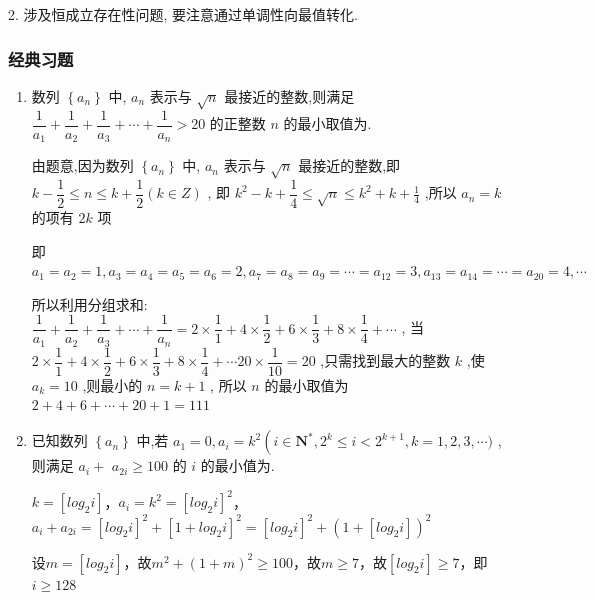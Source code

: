 2. 涉及恒成立存在性问题, 要注意通过单调性向最值转化.

\subsubsection*{经典习题}
\begin{enumerate}
    \item 数列 $\left\{  {a}_{n}\right\}$ 中, ${a}_{n}$ 表示与 $\sqrt{n}$ 最接近的整数,则满足 $\dfrac{1}{{a}_{1}} + \dfrac{1}{{a}_{2}} + \dfrac{1}{{a}_{3}} + \cdots  + \dfrac{1}{{a}_{n}} > {20}$ 的正整数 $n$ 的最小取值为.
    \begin{jieda}
        由题意,因为数列 $\left\{  {a}_{n}\right\}$ 中, ${a}_{n}$ 表示与 $\sqrt{n}$ 最接近的整数,即 $k - \dfrac{1}{2} \leq  n \leq  k + \dfrac{1}{2}\left( {k \in  Z}\right)$ ,
        即 ${k}^{2} - k + \dfrac{1}{4} \leq  \sqrt{n} \leq  {k}^{2} + k + \frac{1}{4}$ ,所以 ${a}_{n} = k$ 的项有 ${2k}$ 项
        
        即 ${a}_{1} = {a}_{2} = 1,{a}_{3} = {a}_{4} = {a}_{5} = {a}_{6} = 2,{a}_{7} = {a}_{8} = {a}_{9} = \cdots  = {a}_{12} = 3,{a}_{13} = {a}_{14} = \cdots  = {a}_{20} = 4,\cdots$
        
        所以利用分组求和: $\dfrac{1}{{a}_{1}} + \dfrac{1}{{a}_{2}} + \dfrac{1}{{a}_{3}} + \cdots  + \dfrac{1}{{a}_{n}} = 2 \times  \dfrac{1}{1} + 4 \times  \dfrac{1}{2} + 6 \times  \dfrac{1}{3} + 8 \times  \dfrac{1}{4} + \cdots$ ,
        当 $2 \times  \dfrac{1}{1} + 4 \times  \dfrac{1}{2} + 6 \times  \dfrac{1}{3} + 8 \times  \dfrac{1}{4} + \cdots {20} \times  \dfrac{1}{10} = {20}$ ,只需找到最大的整数 $k$ ,使 ${a}_{k} = {10}$ ,则最小的 $n = k + 1$ ,
        所以 $n$ 的最小取值为 $2 + 4 + 6 + \cdots  + {20} + 1 = {111}$
    \end{jieda}
    
    \item 已知数列 $\left\{  {a}_{n}\right\}$ 中,若 ${a}_{1} = 0,{a}_{i} = {k}^{2}\left( {i \in  {\mathbf{N}}^{ * }}\right. ,{2}^{k} \leq  i < {2}^{k + 1},k = 1,2,3,\cdots )$ ,则满足 ${a}_{i} +$  ${a}_{2i} \geq  {100}$ 的 $i$ 的最小值为.
    \begin{jieda}
        $k = [log_2i]$，$a_i = k^2 = [log_2i]^2$，$a_i+a_{2i} = [log_2i]^2 + [1+log_2i]^2 = [log_2i]^2 + (1+[log_2i])^2$

        设$m = [log_2i]$，故$m^2 + (1+m)^2 \geq 100$，故$m \geq 7$，故$[log_2i] \geq 7$，即$i \geq 128$
    \end{jieda}
    

\end{enumerate}

